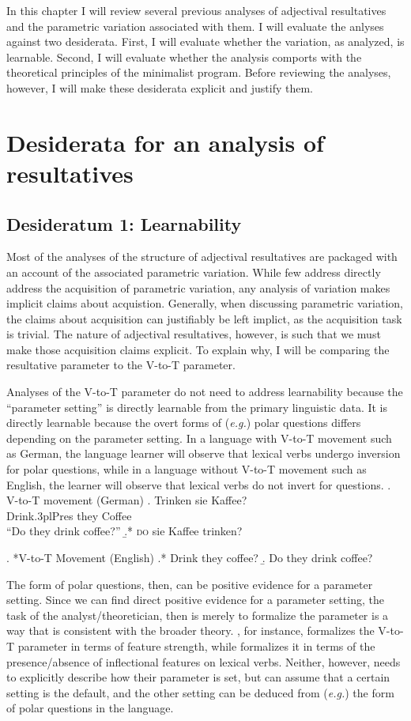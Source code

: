 \documentclass[MilwayThesis]{subfiles}
\begin{document}
In this chapter I will review several previous analyses of adjectival resultatives and the parametric variation associated with them.
I will evaluate the anlyses against two desiderata.
First, I will evaluate whether the variation, as analyzed, is learnable.
Second, I will evaluate whether the analysis comports with the theoretical principles of the minimalist program.
Before reviewing the analyses, however, I will make these desiderata explicit and justify them.

\section{Desiderata for an analysis of resultatives}

\subsection{Desideratum 1: Learnability}
Most of the analyses of the structure of adjectival resultatives are packaged with an account of the associated parametric variation.
While few address directly address the acquisition of parametric variation, any analysis of variation makes implicit claims about acquistion.
Generally, when discussing parametric variation, the claims about acquisition can justifiably be left implict, as the acquisition task is trivial.
The nature of adjectival resultatives, however, is such that we must make those acquisition claims explicit.
To explain why, I will be comparing the resultative parameter to the V-to-T parameter.

Analyses of the V-to-T parameter do not need to address learnability because the ``parameter setting'' is directly learnable from the primary linguistic data.
It is directly learnable because the overt forms of (\textit{e.g.}) polar questions differs depending on the parameter setting.
In a language with V-to-T movement such as German, the language learner will observe that lexical verbs undergo inversion for polar questions, while in a language without V-to-T movement such as English, the learner will observe that lexical verbs do not invert for questions.
\ex. V-to-T movement (German)
\ag. Trinken sie Kaffee?\\
Drink.3plPres they Coffee\\
``Do they drink coffee?''
\b.* \textsc{do} sie Kaffee trinken?

\ex. *V-to-T Movement (English)
\a.* Drink they coffee?
\b. Do they drink coffee?

The form of polar questions, then, can be positive evidence for a parameter setting.
Since we can find direct positive evidence for a parameter setting, the task of the analyst/theoretician, then is merely to formalize the parameter is a way that is consistent with the broader theory.
\textcite{chomsky1995minimalist}, for instance, formalizes the V-to-T parameter in terms of feature strength, while \textcite{lasnik1999verbal} formalizes it in terms of the presence/absence of inflectional features on lexical verbs.
Neither, however, needs to explicitly describe how their parameter is set, but can assume that a certain setting is the default, and the other setting can be deduced from (\textit{e.g.}) the form of polar questions in the language.
\end{document}
